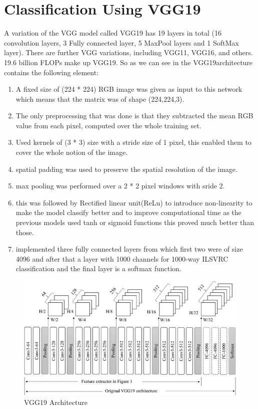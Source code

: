 \section{Classification Using VGG19}
A variation of the VGG model called VGG19 has 19 layers in total (16 convolution layers, 3 Fully connected layer, 5 MaxPool layers and 1 SoftMax layer). There are further VGG variations, including VGG11, VGG16, and others. 19.6 billion FLOPs make up VGG19. So as we can see in the VGG19architecture contains the following element:
\begin{enumerate}
    \item A fixed size of (224 * 224) RGB image was given as input to this network which means that the matrix was of shape (224,224,3).
    \item The only preprocessing that was done is that they subtracted the mean RGB value from each pixel, computed over the whole training set.
    \item Used kernels of (3 * 3) size with a stride size of 1 pixel, this enabled them to cover the whole notion of the image.
    \item spatial padding was used to preserve the spatial resolution of the image.
    \item max pooling was performed over a 2 * 2 pixel windows with sride 2.
    \item this was followed by Rectified linear unit(ReLu) to introduce non-linearity to make the model classify better and to improve computational time as the previous models used tanh or sigmoid functions this proved much better than those.
    \item implemented three fully connected layers from which first two were of size 4096 and after that a layer with 1000 channels for 1000-way ILSVRC classification and the final layer is a softmax function.
\end{enumerate}
\begin{figure}[H]
    \centering
    \includegraphics[scale=0.7]{40_Chapter_4/VGG19.jpg}
    \caption{VGG19 Architecture}
    \label{VGG19 Architecture}
\end{figure}
\vspace{5pt}
